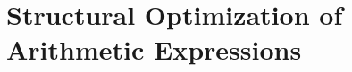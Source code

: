 \documentclass[thesis.tex]{subfiles}
\begin{document}

\chapter{Structural Optimization of Arithmetic Expressions}
\label{chp:stropt}





% 
% 
% 
\end{document}
